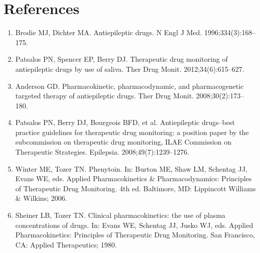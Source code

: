 \section*{References}
\begin{enumerate}
  \item Brodie MJ, Dichter MA. Antiepileptic drugs. N Engl J Med. 1996;334(3):168--175.
  \item Patsalos PN, Spencer EP, Berry DJ. Therapeutic drug monitoring of antiepileptic drugs by use of saliva. Ther Drug Monit. 2012;34(6):615--627.
  \item Anderson GD. Pharmacokinetic, pharmacodynamic, and pharmacogenetic targeted therapy of antiepileptic drugs. Ther Drug Monit. 2008;30(2):173--180.
  \item Patsalos PN, Berry DJ, Bourgeois BFD, et al. Antiepileptic drugs--best practice guidelines for therapeutic drug monitoring: a position paper by the subcommission on therapeutic drug monitoring, ILAE Commission on Therapeutic Strategies. Epilepsia. 2008;49(7):1239--1276.
  \item Winter ME, Tozer TN. Phenytoin. In: Burton ME, Shaw LM, Schentag JJ, Evans WE, eds. Applied Pharmacokinetics \& Pharmacodynamics: Principles of Therapeutic Drug Monitoring. 4th ed. Baltimore, MD: Lippincott Williams \& Wilkins; 2006.
  \item Sheiner LB, Tozer TN. Clinical pharmacokinetics: the use of plasma concentrations of drugs. In: Evans WE, Schentag JJ, Jusko WJ, eds. Applied Pharmacokinetics: Principles of Therapeutic Drug Monitoring. San Francisco, CA: Applied Therapeutics; 1980.
\end{enumerate}

\clearpage
